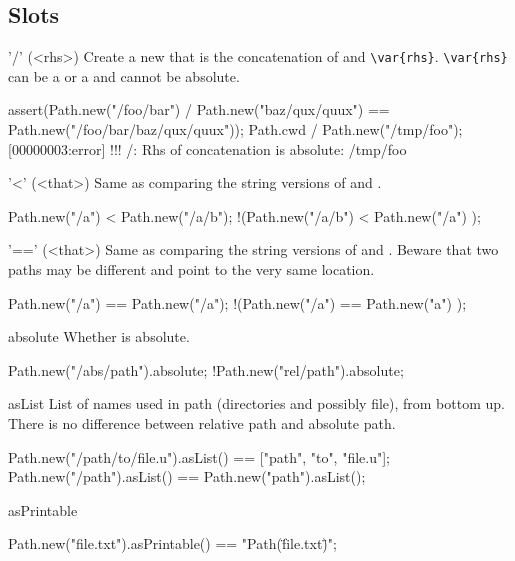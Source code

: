 \subsection{Slots}
\begin{urbiscriptapi}
\item['/'](<rhs>)%
  Create a new  that is the concatenation of
  \this and \lstinline|\var{rhs}|. \lstinline|\var{rhs}|
  can be a  or a  and cannot be absolute.
\begin{urbiscript}
assert(Path.new("/foo/bar") / Path.new("baz/qux/quux")
       == Path.new("/foo/bar/baz/qux/quux"));
Path.cwd / Path.new("/tmp/foo");
[00000003:error] !!! /: Rhs of concatenation is absolute: /tmp/foo
\end{urbiscript}


\item['<'](<that>)%
  Same as comparing the string versions of \this and
  .
\begin{urbiassert}
  Path.new("/a")   < Path.new("/a/b");
!(Path.new("/a/b") < Path.new("/a")  );
\end{urbiassert}


\item['=='](<that>)%
  Same as comparing the string versions of \this and
  .  Beware that two paths may be different and point to the
  very same location.
\begin{urbiassert}
  Path.new("/a")  == Path.new("/a");
!(Path.new("/a")  == Path.new("a")  );
\end{urbiassert}


\item[absolute]
  Whether \this is absolute.
\begin{urbiassert}
Path.new("/abs/path").absolute;
!Path.new("rel/path").absolute;
\end{urbiassert}


\item[asList]
  List of names used in path (directories and possibly file), from
  bottom up. There is no difference between relative path and absolute
  path.
\begin{urbiassert}
Path.new("/path/to/file.u").asList() == ["path", "to", "file.u"];
Path.new("/path").asList()           == Path.new("path").asList();
\end{urbiassert}


\item[asPrintable]
\begin{urbiassert}
Path.new("file.txt").asPrintable() == "Path(\"file.txt\")";
\end{urbiassert}



\end{urbiscriptapi}
